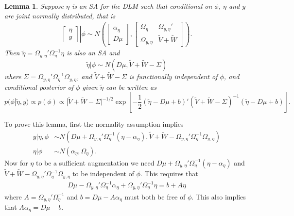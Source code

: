 \documentclass{article}
\newtheorem{lem}[thm]{Lemma}
\begin{document}
\begin{lem}\label{noSA}
Suppose $\eta$ is an SA for the DLM such that conditional on $\phi$, $\eta$ and $y$ are joint normally distributed, that is 
\begin{align*}
 \left. \begin{bmatrix}\eta \\ y \end{bmatrix}\right|\phi \sim N\left(\begin{bmatrix} \alpha_\eta \\ D\mu \end{bmatrix}, \begin{bmatrix} 
   \Omega_\eta & \Omega_{y,\eta}' \\
   \Omega_{y,\eta} & \tilde{V} + \tilde{W} \end{bmatrix}\right).
\end{align*}
Then $\tilde{\eta}=\Omega_{y,\eta}'\Omega_{\eta}^{-1}\eta$ is also an SA and
\[
\tilde{\eta}|\phi \sim N(D\mu,\tilde{V} + \tilde{W} - \Sigma)
\]
where $\Sigma=\Omega_{y,\eta}'\Omega_{\eta}^{-1}\Omega_{y,\eta}$, and $\tilde{V} + \tilde{W} - \Sigma$ is functionally independent of $\phi$, and conditional posterior of $\phi$ given $\tilde{\eta}$ can be written as
\[
p(\phi|\tilde{\eta},y) \propto p(\phi)\propto |\tilde{V} + \tilde{W} - \Sigma|^{-1/2}\exp\left[-\frac{1}{2}(\tilde{\eta} - D\mu + b)'(\tilde{V} + \tilde{W} - \Sigma)^{-1}(\tilde{\eta} - D\mu + b)\right].
\]
\end{lem}
To prove this lemma, first the normality assumption implies
\begin{align*}
  y|\eta,\phi &\sim N(D\mu + \Omega_{y,\eta}'\Omega_\eta^{-1}(\eta - \alpha_\eta), \tilde{V} + \tilde{W} - \Omega_{y,\eta}'\Omega_{\eta}^{-1}\Omega_{y,\eta})\\
  \eta|\phi &\sim N(\alpha_\eta, \Omega_\eta).
\end{align*}
Now for $\eta$ to be a sufficient augmentation we need $D\mu + \Omega_{y,\eta}'\Omega_\eta^{-1}(\eta - \alpha_\eta)$ and $\tilde{V} + \tilde{W} - \Omega_{y,\eta}'\Omega_{\eta}^{-1}\Omega_{y,\eta}$
to be independent of $\phi$. This requires that
\begin{align*}
  D\mu - \Omega_{y,\eta}'\Omega_\eta^{-1}\alpha_\eta + \Omega_{y,\eta}'\Omega_\eta^{-1}\eta  = b + A\eta
\end{align*}
where $A=\Omega_{y,\eta}'\Omega_\eta^{-1}$ and $b=D\mu - A\alpha_\eta$ must both be free of $\phi$. This also implies that $A\alpha_\eta = D\mu - b$.
\end{document}
